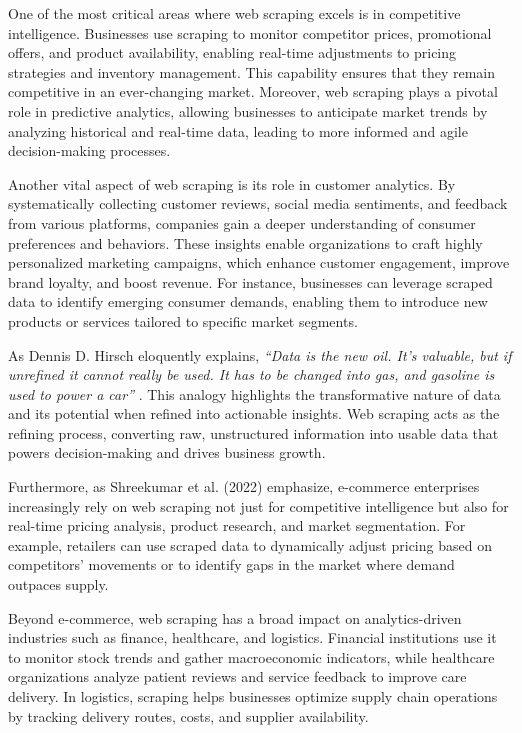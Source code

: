 One of the most critical areas where web scraping excels is in competitive intelligence. Businesses use scraping to monitor competitor prices, promotional offers, and product availability, enabling real-time adjustments to pricing strategies and inventory management. This capability ensures that they remain competitive in an ever-changing market. Moreover, web scraping plays a pivotal role in predictive analytics, allowing businesses to anticipate market trends by analyzing historical and real-time data, leading to more informed and agile decision-making processes.

Another vital aspect of web scraping is its role in customer analytics. By systematically collecting customer reviews, social media sentiments, and feedback from various platforms, companies gain a deeper understanding of consumer preferences and behaviors. These insights enable organizations to craft highly personalized marketing campaigns, which enhance customer engagement, improve brand loyalty, and boost revenue. For instance, businesses can leverage scraped data to identify emerging consumer demands, enabling them to introduce new products or services tailored to specific market segments.

As Dennis D. Hirsch eloquently explains, \textit{“Data is the new oil. It's valuable, but if unrefined it cannot really be used. It has to be changed into gas, and gasoline is used to power a car”} \cite{hirsch2014}. This analogy highlights the transformative nature of data and its potential when refined into actionable insights. Web scraping acts as the refining process, converting raw, unstructured information into usable data that powers decision-making and drives business growth.

Furthermore, as Shreekumar et al. (2022) emphasize, e-commerce enterprises increasingly rely on web scraping not just for competitive intelligence but also for real-time pricing analysis, product research, and market segmentation. For example, retailers can use scraped data to dynamically adjust pricing based on competitors’ movements or to identify gaps in the market where demand outpaces supply. 

Beyond e-commerce, web scraping has a broad impact on analytics-driven industries such as finance, healthcare, and logistics. Financial institutions use it to monitor stock trends and gather macroeconomic indicators, while healthcare organizations analyze patient reviews and service feedback to improve care delivery. In logistics, scraping helps businesses optimize supply chain operations by tracking delivery routes, costs, and supplier availability.

